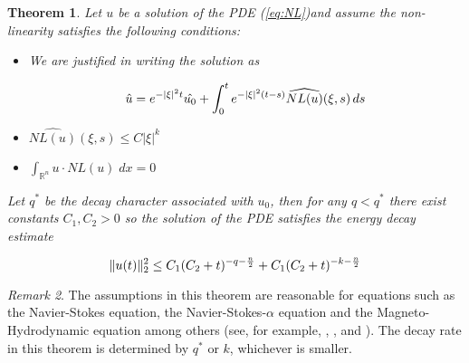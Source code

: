 \documentclass{amsart}
\newtheorem {Theorem}  {Theorem}
\numberwithin{Theorem}{section}
\numberwithin{equation}{section}
\theoremstyle{definition}
\theoremstyle{remark}
\newtheorem{Remark}[Theorem]{Remark}
\begin{document}
\begin{Theorem}

Let $u$ be a solution of the PDE (\ref{eq:NL})and assume the non-linearity satisfies the following conditions:

\begin{itemize}

\item[1.] We are justified in writing the solution as

\begin{equation}\notag
\hat{u}= e^{-|\xi|^2t}\hat{u_0} + \int_0^te^{-|\xi|^2(t-s)}\widehat{NL(u)}(\xi,s)\,ds
\end{equation}

\item[2.] $\widehat{NL(u)}(\xi,s) \leq C|\xi|^k$

\item[3.] $\int_{{\mathbb R}^n} u \cdot NL(u) \;dx =0$

\end{itemize}

Let $q^*$ be the decay character associated with $u_0$, then for any $q<q^*$ there exist constants $C_1,C_2>0$ so the solution of the PDE satisfies the energy decay estimate

\begin{equation}
\|u(t)\|_2^2\leq C_1(C_2+t)^{-q-\frac{n}{2}}+C_1(C_2+t)^{-k-\frac{n}{2}}\notag
\end{equation}

\end{Theorem}

\begin{Remark} The assumptions in this theorem are reasonable for equations such as
the Navier-Stokes equation, the Navier-Stokes-$\alpha$ equation and
the Magneto-Hydrodynamic equation among others (see, for example,
\cite{CS}, \cite{S}, and \cite{MR1380452}). The decay rate in this
theorem is determined by $q^*$ or $k$, whichever is smaller.
\end{Remark}
\end{document}
